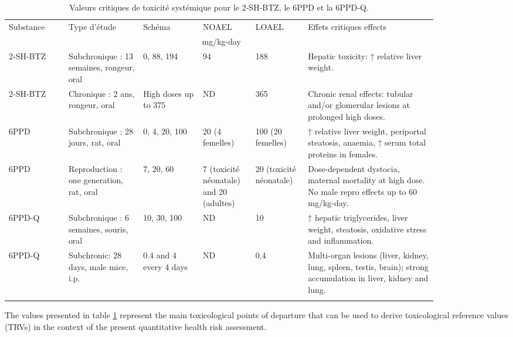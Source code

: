 \documentclass[pdflatex,sn-basic]{sn-jnl}%
\begin{document}
\begin{table}[hp]
\caption{Valeurs critiques de toxicité systémique pour le 2‑SH‑BTZ, le 6PPD et la 6PPD‑Q.}\label{tab1}%
\begin{tabular}{p{0.12\linewidth}p{0.15\linewidth}p{0.12\linewidth}p{0.10\linewidth}p{0.10\linewidth}p{0.26\linewidth}}
\toprule%
Substance & Type d'étude & Schéma & NOAEL & LOAEL & Effets critiques effects\footnotemark[1] \\\cmidrule{3-5}%
& & \multicolumn{3}{c}{mg/kg-day}\\
\midrule
2-SH-BTZ    & Subchronique : 13 semaines, rongeur, oral   & 0, 88, 194  & 94    &    188    &    Hepatic toxicity: ↑ relative liver weight.  \\
2-SH-BTZ    & Chronique : 2 ans, rongeur, oral   & High doses up to 375    & ND    & 365  & Chronic renal effects: tubular and/or glomerular lesions at prolonged high doses.  \\
6PPD    & Subchronique : 28 jours, rat, oral    & 0, 4, 20, 100       & 20 (4 femelles)    & 100 (20 femelles)    &    ↑ relative liver weight, periportal steatosis, anaemia, ↑ serum total proteins in females. \\
6PPD    & Reproduction : one generation, rat, oral    &    7, 20, 60    & 7 (toxicité néonatale) and 20 (adultes)    & 20 (toxicité néonatale)   & Dose-dependent dystocia, maternal mortality at high dose. No male repro effects up to 60 mg/kg-day. \\
6PPD-Q    & Subchronique : 6 semaines, souris, oral    &    10, 30, 100   & ND    &    10     & ↑ hepatic triglycerides, liver weight, steatosis, oxidative stress and inflammation. \\
6PPD-Q    & Subchronic: 28 days, male mice, i.p.   & 0.4 and 4 every 4 days    &    ND    & 0.4  & Multi-organ lesions (liver, kidney, lung, spleen, testis, brain); strong accumulation in liver, kidney and lung. \\
\botrule

\end{tabular}
\end{table}

The values presented in table \ref{tab1} represent the main toxicological points of departure that can be used to derive toxicological reference values (TRVs) in the context of the present quantitative health risk assessment.
\end{document}
